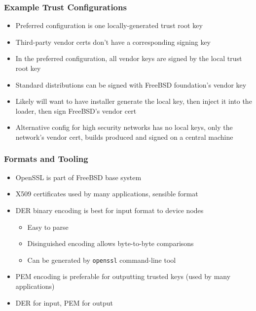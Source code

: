 \documentclass{beamer}
\begin{document}
\begin{frame}
  \frametitle{Example Trust Configurations}
  \begin{itemize}
  \item Preferred configuration is one locally-generated trust root
    key
  \item Third-party vendor certs don't have a corresponding signing key
  \item In the preferred configuration, all vendor keys are signed by
    the local trust root key
  \item Standard distributions can be signed with FreeBSD foundation's
    vendor key
  \item Likely will want to have installer generate the local key,
    then inject it into the loader, then sign FreeBSD's vendor cert
  \item Alternative config for high security networks has no local
    keys, only the network's vendor cert, builds produced and signed
    on a central machine
  \end{itemize}
\end{frame}

\begin{frame}
  \frametitle{Formats and Tooling}
  \begin{itemize}
  \item OpenSSL is part of FreeBSD base system
  \item X509 certificates used by many applications, sensible format
  \item DER binary encoding is best for input format to device nodes
    \begin{itemize}
    \item Easy to parse
    \item Disinguished encoding allows byte-to-byte comparisons
    \item Can be generated by \texttt{openssl} command-line tool
    \end{itemize}
  \item PEM encoding is preferable for outputting trusted keys (used
    by many applications)
  \item DER for input, PEM for output
  \end{itemize}
\end{frame}
\end{document}
